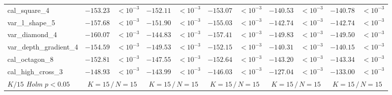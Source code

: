 \begin{tabular}{@{}l rr rr rr rr rr@{}}
cal\_square\_4 & $\mathbf{-153.23}$ & $<\!10^{-3}$ & $\mathbf{-152.11}$ & $<\!10^{-3}$ & $\mathbf{-153.07}$ & $<\!10^{-3}$ & $\mathbf{-140.53}$ & $<\!10^{-3}$ & $\mathbf{-140.78}$ & $<\!10^{-3}$ \\
var\_l\_shape\_5 & $\mathbf{-157.68}$ & $<\!10^{-3}$ & $\mathbf{-151.90}$ & $<\!10^{-3}$ & $\mathbf{-155.03}$ & $<\!10^{-3}$ & $\mathbf{-142.74}$ & $<\!10^{-3}$ & $\mathbf{-142.74}$ & $<\!10^{-3}$ \\
var\_diamond\_4 & $\mathbf{-160.07}$ & $<\!10^{-3}$ & $\mathbf{-144.83}$ & $<\!10^{-3}$ & $\mathbf{-157.41}$ & $<\!10^{-3}$ & $\mathbf{-149.83}$ & $<\!10^{-3}$ & $\mathbf{-149.50}$ & $<\!10^{-3}$ \\
var\_depth\_gradient\_4 & $\mathbf{-154.59}$ & $<\!10^{-3}$ & $\mathbf{-149.53}$ & $<\!10^{-3}$ & $\mathbf{-152.15}$ & $<\!10^{-3}$ & $\mathbf{-140.31}$ & $<\!10^{-3}$ & $\mathbf{-140.15}$ & $<\!10^{-3}$ \\
cal\_octagon\_8 & $\mathbf{-152.81}$ & $<\!10^{-3}$ & $\mathbf{-147.55}$ & $<\!10^{-3}$ & $\mathbf{-152.64}$ & $<\!10^{-3}$ & $\mathbf{-143.20}$ & $<\!10^{-3}$ & $\mathbf{-143.34}$ & $<\!10^{-3}$ \\
cal\_high\_cross\_3 & $\mathbf{-148.93}$ & $<\!10^{-3}$ & $\mathbf{-143.99}$ & $<\!10^{-3}$ & $\mathbf{-146.03}$ & $<\!10^{-3}$ & $\mathbf{-127.04}$ & $<\!10^{-3}$ & $\mathbf{-133.00}$ & $<\!10^{-3}$ \\
\midrule
\emph{$K/15$ Holm $p<0.05$} & \multicolumn{2}{c}{$K{=}15\,/\,N{=}15$} & \multicolumn{2}{c}{$K{=}15\,/\,N{=}15$} & \multicolumn{2}{c}{$K{=}15\,/\,N{=}15$} & \multicolumn{2}{c}{$K{=}15\,/\,N{=}15$} & \multicolumn{2}{c}{$K{=}15\,/\,N{=}15$} \\
\bottomrule
\end{tabular}